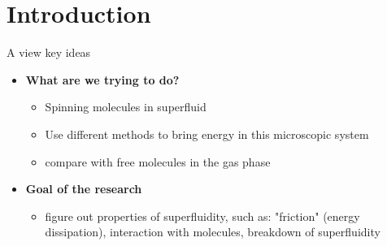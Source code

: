 \section{Introduction}

\begin{frame}{A view key ideas}
  \begin{itemize}
    \item \textbf{What are we trying to do?}
    \begin{itemize}
      \item Spinning molecules in superfluid 
      \item Use different methods to bring energy in this microscopic system
      \item compare with free molecules in the gas phase
    \end{itemize}
    \item \textbf{Goal of the research}
    \begin{itemize}
      \item figure out properties of superfluidity, such as: "friction" (energy dissipation), interaction with molecules, breakdown of superfluidity 
    \end{itemize}
  \end{itemize}
\end{frame}
